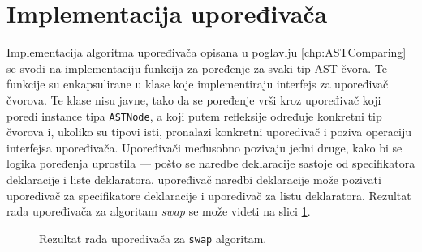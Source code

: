 \section{Implementacija upoređivača}
\label{sec:ImplementationComparer}

Implementacija algoritma upoređivača opisana u poglavlju \ref{chp:ASTComparing} se svodi na implementaciju funkcija za poređenje za svaki tip AST čvora. Te funkcije su enkapsulirane u klase koje implementiraju interfejs za upoređivač čvorova. Te klase nisu javne, tako da se poređenje vrši kroz upoređivač koji poredi instance tipa \texttt{ASTNode}, a koji putem refleksije određuje konkretni tip čvorova i, ukoliko su tipovi isti, pronalazi konkretni upoređivač i poziva operaciju interfejsa upoređivača. Upoređivači međusobno pozivaju jedni druge, kako bi se logika poređenja uprostila --- pošto se naredbe deklaracije sastoje od specifikatora deklaracije i liste deklaratora, upoređivač naredbi deklaracije može pozivati upoređivač za specifikatore deklaracije i upoređivač za listu deklaratora. Rezultat rada upoređivača za algoritam \emph{swap} se može videti na slici \ref{fig:ComparerSwap}.

\begin{figure}[h!]
\centering
\caption{Rezultat rada upoređivača za \texttt{swap} algoritam.}
\label{fig:ComparerSwap}
\end{figure}
